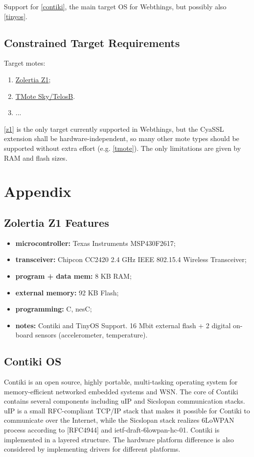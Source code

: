 \documentclass[10pt]{article}
\begin{document}
Support for \ref{contiki}, the main target OS for Webthings, but possibly also \ref{tinyos}.

\subsection{Constrained Target Requirements}
Target motes:
\begin{enumerate}
\item\label{z1} \href{http://www.zolertia.com/ti}{Zolertia Z1};
\item\label{tmote} \href{http://www.ti.com/tool/msp430-3p-motei-tmotesky-dsgkt}{TMote Sky/TelosB}.
\item ...
\end{enumerate}

\ref{z1} is the only target currently supported in Webthings, but the CyaSSL extension shall be hardware-independent, so many other mote types should be supported without extra effort (e.g. \ref{tmote}). The only limitations are given by RAM and flash sizes.

\section{Appendix}

\subsection{Zolertia Z1 Features}
\begin{itemize}
  \item \textbf{microcontroller:} Texas Instruments MSP430F2617;
  \item \textbf{transceiver:} Chipcon CC2420 2.4 GHz IEEE 802.15.4 Wireless Transceiver;
  \item \textbf{program + data mem:} 8 KB RAM;
  \item \textbf{external memory:} 92 KB Flash;
  \item \textbf{programming:} C, nesC;
  \item \textbf{notes:} Contiki and TinyOS Support. 16 Mbit external flash + 2 digital on-board sensors (accelerometer, temperature).
\end{itemize}

\subsection{Contiki OS}
Contiki is an open source, highly portable, multi-tasking operating system for memory-efficient networked embedded systems and WSN.  The core of Contiki contains several components including uIP and Sicslopan communication stacks. uIP is a small RFC-compliant TCP/IP stack that makes it possible for Contiki to communicate over the Internet, while the Sicslopan stack realizes 6LoWPAN process according to [RFC4944] and ietf-draft-6lowpan-hc-01.  Contiki is implemented in a layered structure.  The hardware platform difference is also considered by implementing drivers for different platforms.  
\end{document}
